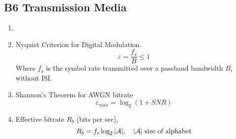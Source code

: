\documentclass[../../main.tex]{subfiles}
\begin{document}
\subsection{B6 Transmission Media}
\begin{wtr}
\begin{enumerate}
    \item[]
    \item Nyquist Criterion for Digital Modulation.
    \[
    \varepsilon=\dfrac{f_s}{B}\leq 1
    \]
    Where $f_s$ is the symbol rate transmitted over a passband bandwidth $B$, without ISI.
    \item Shannon's Theorem for AWGN bitrate
    \[
    \varepsilon_{max} = \log_2(1+SNR)
    \]
    \item Effective bitrate $R_b$ (bits per sec),
    \[
    R_b = f_s\log_2|\cal{A}|,\quad |\cal{A}| \text{ size of alphabet}
    \]
\end{enumerate}
    
\end{wtr}
\end{document}
